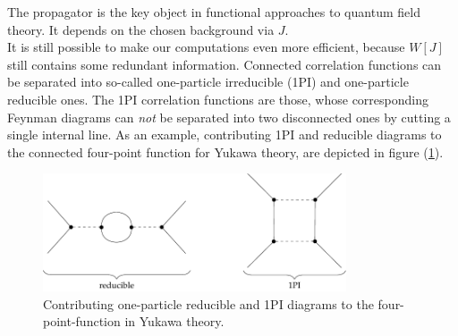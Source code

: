 The propagator is the key object in functional approaches to quantum field theory. It depends on the chosen background via $J$. \\
It is still possible to make our computations even more efficient, because $W[J]$ still contains some redundant information. Connected correlation functions can be separated into so-called one-particle irreducible (1PI) and one-particle reducible ones. The 1PI correlation functions are those, whose corresponding Feynman diagrams can \textit{not} be separated into two disconnected ones by cutting a single internal line. As an example, contributing 1PI and reducible diagrams to the connected four-point function for Yukawa theory, are depicted in figure (\ref{fig:1PI_Yukawa}). 
\begin{figure}[t]
\centering
\includegraphics[width=0.8\textwidth]{figs/TikZ/1PI_Yukawa}
\caption{Contributing one-particle reducible and 1PI diagrams to the four-point-function in Yukawa theory.}	
\label{fig:1PI_Yukawa}
\end{figure}

